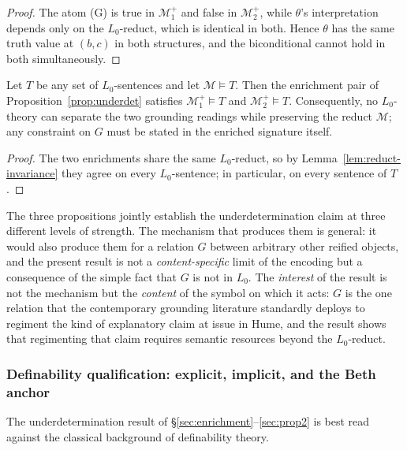 \begin{proof}
The atom (G) is true in $\mathcal M_1^+$ and false in
$\mathcal M_2^+$, while $\theta$'s interpretation depends only on
the $L_0$-reduct, which is identical in both. Hence $\theta$ has
the same truth value at $(b,c)$ in both structures, and the
biconditional cannot hold in both simultaneously.
\end{proof}

\begin{proposition}
\label{prop:stability}
Let $T$ be any set of $L_0$-sentences and let
$\mathcal M\models T$. Then the enrichment pair of
Proposition~\ref{prop:underdet} satisfies
$\mathcal M_1^+\models T$ and $\mathcal M_2^+\models T$. Consequently,
no $L_0$-theory can separate the two grounding readings while
preserving the reduct $\mathcal M$; any constraint on $G$ must be
stated in the enriched signature itself.
\end{proposition}

\begin{proof}
The two enrichments share the same $L_0$-reduct, so by
Lemma~\ref{lem:reduct-invariance} they agree on every
$L_0$-sentence; in particular, on every sentence of $T$.
\end{proof}

The three propositions jointly establish the underdetermination
claim at three different levels of strength. The mechanism that
produces them is general: it would also produce them for a relation
$G$ between arbitrary other reified objects, and the present result
is not a \emph{content-specific} limit of the encoding but a
consequence of the simple fact that $G$ is not in $L_0$. The
\emph{interest} of the result is not the mechanism but the
\emph{content} of the symbol on which it acts: $G$ is the one
relation that the contemporary grounding literature standardly
deploys to regiment the kind of explanatory claim at issue in
Hume, and the result shows that regimenting that claim requires
semantic resources beyond the $L_0$-reduct.

\subsubsection{Definability qualification: explicit, implicit, and the Beth anchor}
\label{sec:definability-qual}

The underdetermination result of
\S\ref{sec:enrichment}--\ref{sec:prop2} is best read against the
classical background of definability theory.

